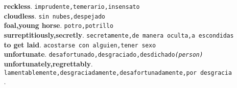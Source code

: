 \documentclass[twocolumn]{article}
\begin{document}
  \textsf{\textbf{reckless}}. \texttt{imprudente,temerario,insensato}\\
  \textsf{\textbf{cloudless}}. \texttt{sin nubes,despejado}\\
  \textsf{\textbf{foal,young horse}}. \texttt{potro,potrillo}\\
  \textsf{\textbf{surreptitiously,secretly}}. \texttt{secretamente,de manera oculta,a escondidas}\\
  \textsf{\textbf{to get laid}}. \texttt{acostarse con alguien,tener sexo}\\
  \textsf{\textbf{unfortunate}}. \texttt{desafortunado,desgraciado,desdichado{\scriptsize \textsl{(person)}}}\\
  \textsf{\textbf{unfortunately,regrettably}}. \texttt{lamentablemente,desgraciadamente,desafortunadamente,por desgracia}\\
  \textsf{\textbf{}}. \texttt{}\\

  \newpage
  \newpage
\end{document}
